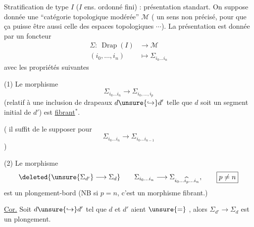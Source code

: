 
Stratification 
de type \(I\) (\(I\) ens. ordonné fini) : présentation standart.
On suppose donnée une ``catégorie topologique modérée'' \(\mathcal M\)
(  un sens non précisé, pour que ça puisse être aussi celle des
espaces topologiques \(\cdots\)). La présentation est donnée
par un  foncteur
\[
 \begin{aligned}
 \Sigma:\ \operatorname{Drap}(I)&\longrightarrow\mathcal M\\
 (i_0,\ldots,i_n)&\longmapsto\Sigma_{i_0\ldots i_n}
 \end{aligned}
\]
avec les propriétés suivantes

(1) Le  morphisme
\[
 \Sigma_{i_0\ldots i_n}\longrightarrow\Sigma_{i_0,\ldots,i_p}
\]
(relatif à une inclusion de drapeaux
\(d\unsure{\hookrightarrow}d'\) telle
que \(d\) soit un segment initial de \(d'\)) est \uline{fibrant}\(^*\).



 ( il suffit de le supposer pour
\[
 \Sigma_{i_0\ldots i_n}\longrightarrow\Sigma_{i_0\ldots i_{n-1}}
\]
)

(2) Le morphisme
\[
 \deleted{\unsure{\Sigma_{d'}}\longrightarrow\Sigma_d}
 \qquad
 \Sigma_{i_0\ldots i_n}
 \longrightarrow
 \Sigma_{i_0\ldots\widehat{i_p}\ldots i_n},
 \qquad \boxed{p\ne n}
\]
est un plongement-bord
(NB si \(p=n\), c'est un morphisme fibrant.)


\uline{Cor.} Soit \(d\unsure{\hookrightarrow}d'\)
tel que \(d\) et \(d'\) aient \(\unsure{=}\)
, alors
\(\Sigma_{d'}\longrightarrow\Sigma_d\) est un plongement.


